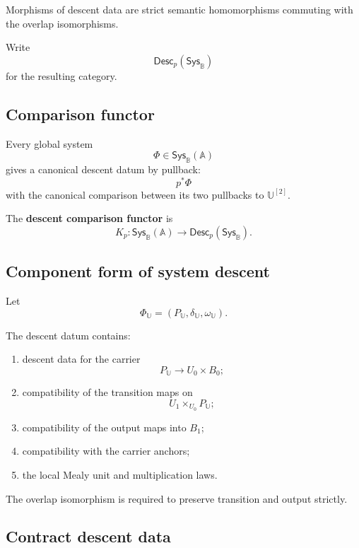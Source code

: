Morphisms of descent data are strict semantic homomorphisms commuting with the
overlap isomorphisms.

Write
\[
    \mathsf{Desc}_p(\mathsf{Sys}_{\mathbb B})
\]
for the resulting category.

\subsection{Comparison functor}
\label{subsec:comparison-functor-system-descent}

Every global system
\[
    \Phi\in\mathsf{Sys}_{\mathbb B}(\mathbb A)
\]
gives a canonical descent datum by pullback:
\[
    p^\ast\Phi
\]
with the canonical comparison between its two pullbacks to
\(\mathbb U^{[2]}\).

\begin{definition}
\label{def:system-descent-comparison}
The \textbf{descent comparison functor} is
\[
    K_p:
    \mathsf{Sys}_{\mathbb B}(\mathbb A)
    \to
    \mathsf{Desc}_p(\mathsf{Sys}_{\mathbb B}).
\]
\end{definition}

\subsection{Component form of system descent}
\label{subsec:component-form-system-descent}

Let
\[
    \Phi_{\mathbb U}
    =
    (P_{\mathbb U},
    \delta_{\mathbb U},
    \omega_{\mathbb U}).
\]

The descent datum contains:
\begin{enumerate}
    \item descent data for the carrier
    \[
        P_{\mathbb U}
        \to
        U_0\times B_0;
    \]
    \item compatibility of the transition maps on
    \[
        U_1\times_{U_0}P_{\mathbb U};
    \]
    \item compatibility of the output maps into \(B_1\);
    \item compatibility with the carrier anchors;
    \item the local Mealy unit and multiplication laws.
\end{enumerate}

The overlap isomorphism is required to preserve transition and output
strictly.

\subsection{Contract descent data}
\label{subsec:contract-descent-data}

